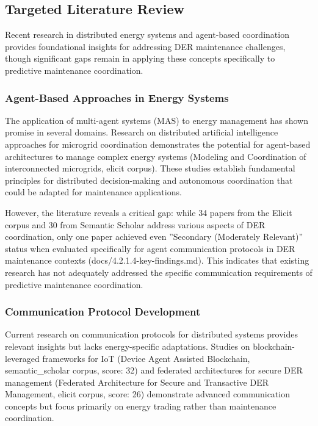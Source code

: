 \subsection{Targeted Literature Review}

Recent research in distributed energy systems and agent-based coordination provides foundational insights for addressing DER maintenance challenges, though significant gaps remain in applying these concepts specifically to predictive maintenance coordination.

\subsubsection{Agent-Based Approaches in Energy Systems}

The application of multi-agent systems (MAS) to energy management has shown promise in several domains. Research on distributed artificial intelligence approaches for microgrid coordination demonstrates the potential for agent-based architectures to manage complex energy systems (Modeling and Coordination of interconnected microgrids, elicit corpus). These studies establish fundamental principles for distributed decision-making and autonomous coordination that could be adapted for maintenance applications.

However, the literature reveals a critical gap: while 34 papers from the Elicit corpus and 30 from Semantic Scholar address various aspects of DER coordination, only one paper achieved even ''Secondary (Moderately Relevant)'' status when evaluated specifically for agent communication protocols in DER maintenance contexts (docs/4.2.1.4-key-findings.md). This indicates that existing research has not adequately addressed the specific communication requirements of predictive maintenance coordination.

\subsubsection{Communication Protocol Development}

Current research on communication protocols for distributed systems provides relevant insights but lacks energy-specific adaptations. Studies on blockchain-leveraged frameworks for IoT (Device Agent Assisted Blockchain, semantic_scholar corpus, score: 32) and federated architectures for secure DER management (Federated Architecture for Secure and Transactive DER Management, elicit corpus, score: 26) demonstrate advanced communication concepts but focus primarily on energy trading rather than maintenance coordination.

